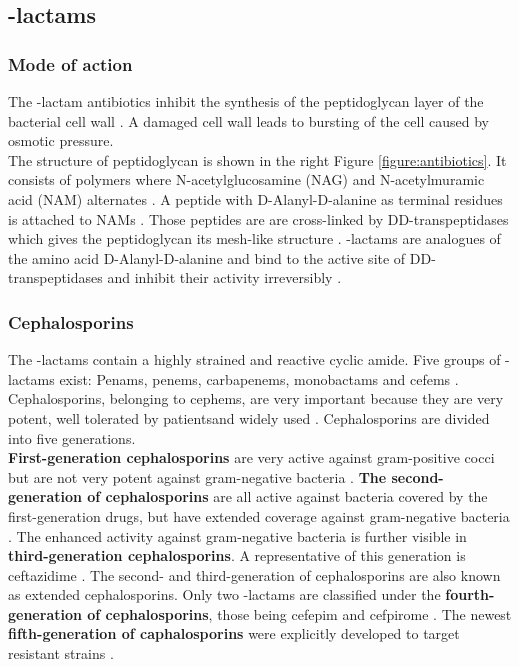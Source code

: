 \subsection{\textbeta-lactams}
\subsubsection{Mode of action}
The \textbeta-lactam antibiotics inhibit the synthesis of the peptidoglycan layer of the bacterial cell wall \cite{noauthor_-lactam_2019}. A damaged cell wall leads to bursting of the cell caused by osmotic pressure. \\
The structure of peptidoglycan is shown in the right Figure \ref{figure:antibiotics}. It consists of polymers where N-acetylglucosamine (NAG) and N-acetylmuramic acid (NAM) alternates \cite{fisher_bacterial_2005}. A peptide with D-Alanyl-D-alanine as terminal residues is attached to NAMs \cite{fisher_bacterial_2005}. Those peptides are are cross-linked by DD-transpeptidases which gives the peptidoglycan its mesh-like structure \cite{fisher_bacterial_2005}. \textbeta-lactams are analogues of the amino acid D-Alanyl-D-alanine and bind to the active site of DD-transpeptidases and inhibit their activity irreversibly \cite{fisher_bacterial_2005}. 

\subsubsection{Cephalosporins}
The \textbeta-lactams contain a highly strained and reactive cyclic amide. Five groups of \textbeta-lactams exist: Penams, penems, carbapenems, monobactams and cefems \cite{beta-lactam_nodate}. 
Cephalosporins, belonging to cephems, are very important because they are very potent, well tolerated by patientsand widely used \cite{dancer_problem_2001}. Cephalosporins are divided into five generations.\\
\textbf{First-generation cephalosporins} are very active against gram-positive cocci but are not very potent against gram-negative bacteria \cite{fernandes_-lactams:_2013}. \textbf{The second-generation of cephalosporins} are all active against bacteria covered by the first-generation drugs, but have extended coverage against gram-negative bacteria \cite{fernandes_-lactams:_2013}. The enhanced activity against gram-negative bacteria is further visible in \textbf{third-generation cephalosporins}. A representative of this generation is ceftazidime \cite{klein_third-generation_1995}. The second- and third-generation of cephalosporins are also known as extended cephalosporins. Only two \textbeta-lactams are classified under the \textbf{fourth-generation of cephalosporins}, those being cefepim and cefpirome \cite{fernandes_-lactams:_2013}. The newest \textbf{fifth-generation of caphalosporins} were explicitly developed to target resistant strains \cite{fernandes_-lactams:_2013}.\\

